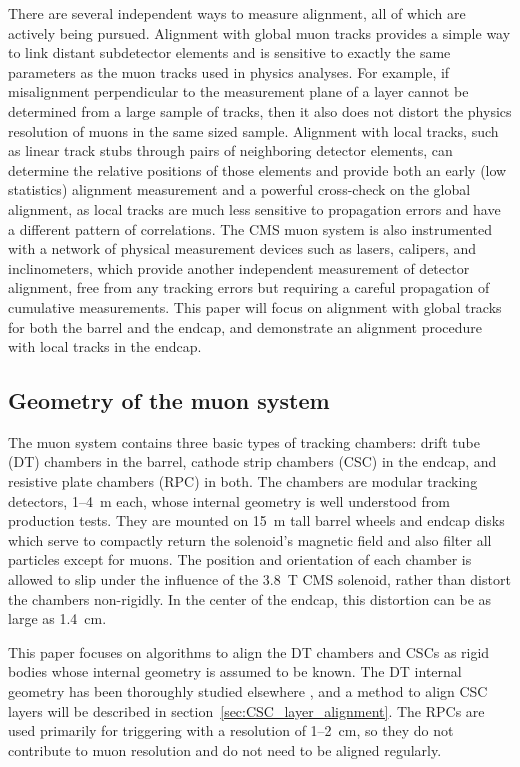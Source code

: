 \documentclass[12pt]{article}
\begin{document}
There are several independent ways to measure alignment, all of which
are actively being pursued.  Alignment with global muon tracks
provides a simple way to link distant subdetector elements and is
sensitive to exactly the same parameters as the muon tracks used in
physics analyses.  For example, if misalignment perpendicular to the
measurement plane of a layer cannot be determined from a large sample
of tracks, then it also does not distort the physics resolution of
muons in the same sized sample.  Alignment with local tracks, such as
linear track stubs through pairs of neighboring detector elements, can
determine the relative positions of those elements and provide both an
early (low statistics) alignment measurement and a powerful
cross-check on the global alignment, as local tracks are much less
sensitive to propagation errors and have a different pattern of
correlations.  The CMS muon system is also instrumented with a network
of physical measurement devices such as lasers, calipers, and
inclinometers, which provide another independent measurement of
detector alignment, free from any tracking errors but requiring a
careful propagation of cumulative measurements.  This paper will focus
on alignment with global tracks for both the barrel and the endcap,
and demonstrate an alignment procedure with local tracks in the
endcap.

\subsection{Geometry of the muon system}

The muon system contains three basic types of tracking chambers: drift
tube (DT) chambers in the barrel, cathode strip chambers (CSC) in the
endcap, and resistive plate chambers (RPC) in both.  The chambers are
modular tracking detectors, 1--4~m each, whose internal geometry is
well understood from production tests.  They are mounted on 15~m tall
barrel wheels and endcap disks which serve to compactly return the
solenoid's magnetic field and also filter all particles except for
muons.  The position and orientation of each chamber is allowed to
slip under the influence of the 3.8~T CMS solenoid, rather than
distort the chambers non-rigidly.  In the center of the endcap, this
distortion can be as large as 1.4~cm.

This paper focuses on algorithms to align the DT chambers and CSCs as
rigid bodies whose internal geometry is assumed to be known.  The DT
internal geometry has been thoroughly studied elsewhere
\cite{internal_dt}, and a method to align CSC layers will be described
in section~\ref{sec:CSC_layer_alignment}.  The RPCs are used primarily
for triggering with a resolution of 1--2~cm, so they do not contribute
to muon resolution and do not need to be aligned regularly.
\end{document}
